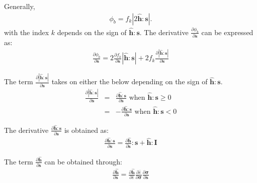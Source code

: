 \documentclass[12pt]{amsart}
\begin{document}
Generally,
\begin{eqnarray}
    \label{eq:fluc1}
\phi_b  =f_k|2\hat{\mathbf{h}}:\mathbf{s}|.
\end{eqnarray}
with the index $k$ depends on the sign of $\hat{\mathbf{h}}:\mathbf{s}$.
The derivative $\frac{\partial{\phi_b}}{\partial{\mathbf{s}}}$ can be expressed as:
\begin{eqnarray}
    \label{eq:dphib1}
\frac{\partial{\phi_b}}{\partial{\mathbf{s}}} = 2\frac{\partial{f_k}}{\partial{\mathbf{s}}} |\hat{\mathbf{h}}:\mathbf{s}| + 2 f_k \frac{\partial{|\hat{\mathbf{h}}:\mathbf{s}|}}{\partial{\mathbf{s}}}
\end{eqnarray}


The term $\frac{\partial{|\hat{\mathbf{h}}:\mathbf{s}|}}{\partial{\mathbf{s}}}$ takes on either the below depending on the sign of $\hat{\mathbf{h}}:\mathbf{s}$.
\begin{eqnarray}
  \label{eq:dphib2}
  \frac{\partial{|\hat{\mathbf{h}}:\mathbf{s}|}}{\partial{\mathbf{s}}} &=&  \frac{\partial{\hat{\mathbf{h}}:\mathbf{s}}}{\partial{\mathbf{s}}}   \text{  when } \hat{\mathbf{h}}:\mathbf{s}\ge0\\
                                                                       &=& -\frac{\partial{\hat{\mathbf{h}}:\mathbf{s}}}{\partial{\mathbf{s}}}   \text{  when } \hat{\mathbf{h}}:\mathbf{s} < 0
\end{eqnarray}

The derivative  $\frac{\partial{\hat{\mathbf{h}}:\mathbf{s}}}{\partial{\mathbf{s}}}$ is obtained as:
\begin{eqnarray}
  \label{eq:dphib3}
\frac{\partial{\hat{\mathbf{h}}:\mathbf{s}}}{\partial{\mathbf{s}}}   =   \frac{\partial{\hat{\mathbf{h}}}}{\partial{\mathbf{s}}} : \mathbf{s} +\hat{\mathbf{h}}:\mathbf{I}
\end{eqnarray}

The term $ \frac{\partial{\hat{\mathbf{h}}}}{\partial{\mathbf{s}}} $ can be obtained through:
\begin{eqnarray}
  \label{eq:dphib4}
\frac{\partial{\hat{\mathbf{h}}}}{\partial{\mathbf{s}}}=\frac{\partial{\hat{\mathbf{h}}}}{\partial{\bar{\varepsilon}}}   \frac{\partial{\bar{\varepsilon}}}{\partial{\mathbf{\sigma}}}    \frac{\partial{\mathbf{\sigma}}}{\partial{\mathbf{s}}}
\end{eqnarray}
\end{document}
